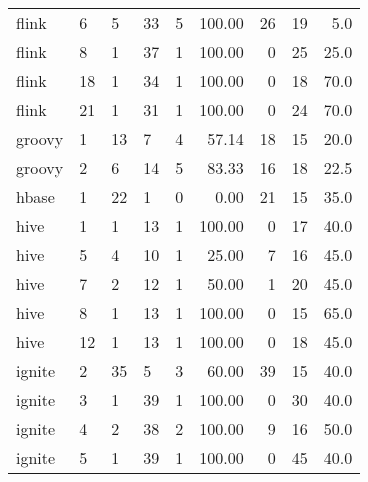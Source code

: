\begin{tabular}{lllllrrlr}
    flink &             6 &            5 &               33 &       5 &       100.00 &            26 &           19 &           5.0 \\
    flink &             8 &            1 &               37 &       1 &       100.00 &             0 &           25 &          25.0 \\
    flink &            18 &            1 &               34 &       1 &       100.00 &             0 &           18 &          70.0 \\
    flink &            21 &            1 &               31 &       1 &       100.00 &             0 &           24 &          70.0 \\
   groovy &             1 &           13 &                7 &       4 &        57.14 &            18 &           15 &          20.0 \\
   groovy &             2 &            6 &               14 &       5 &        83.33 &            16 &           18 &          22.5 \\
    hbase &             1 &           22 &                1 &       0 &         0.00 &            21 &           15 &          35.0 \\
     hive &             1 &            1 &               13 &       1 &       100.00 &             0 &           17 &          40.0 \\
     hive &             5 &            4 &               10 &       1 &        25.00 &             7 &           16 &          45.0 \\
     hive &             7 &            2 &               12 &       1 &        50.00 &             1 &           20 &          45.0 \\
     hive &             8 &            1 &               13 &       1 &       100.00 &             0 &           15 &          65.0 \\
     hive &            12 &            1 &               13 &       1 &       100.00 &             0 &           18 &          45.0 \\
   ignite &             2 &           35 &                5 &       3 &        60.00 &            39 &           15 &          40.0 \\
   ignite &             3 &            1 &               39 &       1 &       100.00 &             0 &           30 &          40.0 \\
   ignite &             4 &            2 &               38 &       2 &       100.00 &             9 &           16 &          50.0 \\
   ignite &             5 &            1 &               39 &       1 &       100.00 &             0 &           45 &          40.0 \\
\bottomrule
\end{tabular}
